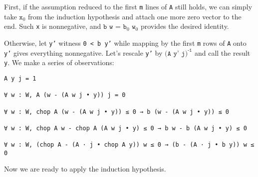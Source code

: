 \documentclass[]{article}
\begin{document}
First, if the assumption reduced to the first \texttt{m} lines of \texttt{A} still holds,
we can simply take $\texttt{x}_0$ from the induction hypothesis and attach one more zero vector
to the end. Such \texttt{x} is nonnegative, and $\texttt{b w = b}_0\texttt{ w}_0$ provides
the desired identity.

Otherwise, let \texttt{y'} witness \texttt{0 < b y'} while mapping by the first \texttt{m} rows
of \texttt{A} onto \texttt{y'} gives everything nonnegative.
Let's rescale \texttt{y'} by $\texttt{(A y' j)}^{\texttt{-1}}$ and call the result \texttt{y}.
We make a series of observations:
\begin{lstlisting}
A y j = 1

∀ w : W, A (w - (A w j • y)) j = 0

∀ w : W, chop A (w - (A w j • y)) ≤ 0 → b (w - (A w j • y)) ≤ 0

∀ w : W, chop A w - chop A (A w j • y) ≤ 0 → b w - b (A w j • y) ≤ 0

∀ w : W, (chop A - (A · j • chop A y)) w ≤ 0 → (b - (A · j • b y)) w ≤ 0
\end{lstlisting}
Now we are ready to apply the induction hypothesis.
	
\end{document}
